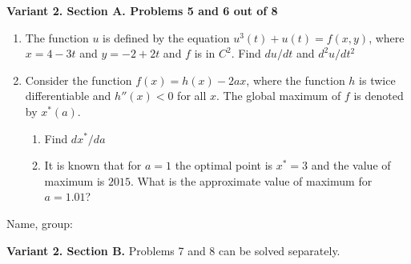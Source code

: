 \documentclass[12pt,a4paper]{article}
\begin{document}
\newpage
\textbf{Variant 2. Section A. Problems 5 and 6 out of 8}


\begin{enumerate}[resume]

\item The function $u$ is defined by the equation $u^3(t) + u(t) = f(x,y)$, where $x=4-3t$ and $y=-2+2t$ and $f$ is in $C^2$. Find $du/dt$ and $d^2 u/dt^2$



\item Consider the function $f(x)=h(x)-2ax$, where the function $h$ is twice differentiable and $h''(x)<0$ for all $x$. The global maximum of $f$ is denoted by $x^*(a)$.
\begin{enumerate}
\item Find $dx^*/da$
\item It is known that for $a=1$ the optimal point is $x^*=3$ and the value of maximum is $2015$. What is the approximate value of maximum for $a=1.01$?
\end{enumerate}

\end{enumerate}

\begin{framed}
\begin{minipage}{42em}
Name, group:\vspace*{3ex}\par 
\noindent\dotfill
\end{minipage}
\end{framed}



\newpage
\textbf{Variant 2. Section B.} Problems 7 and 8 can be solved separately.
\end{document}
